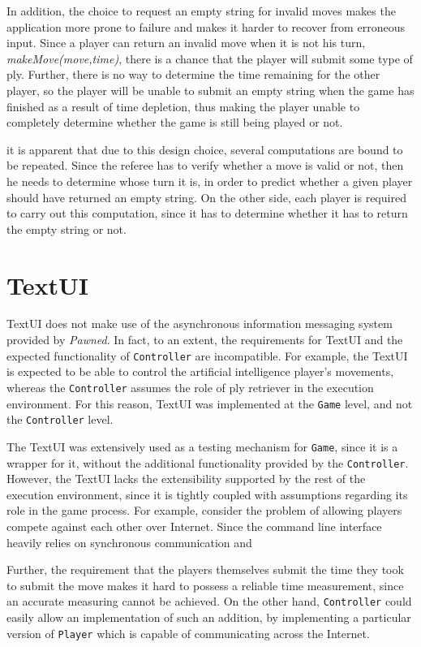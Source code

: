 In addition, the choice to request an empty string for invalid moves makes the application more prone to failure and makes it harder to
recover from erroneous input. Since a  player can return an invalid move when it is not his turn, \emph{makeMove(move,time)}, there
is a chance that the player will submit some type of ply. Further, there is no way to determine the time remaining for the other player,
so the player will be unable to submit an empty string when the game has finished as a result of time depletion, thus making the 
player unable to completely determine whether the game is still being played or not. 

it is apparent that due to this design choice, several computations are bound to be repeated. Since the referee has to verify whether a 
move is valid or not, then he needs to determine whose turn it is, in order to predict whether a given player should have returned an 
empty string. On the other side, each player is required to carry out this computation, since it has to determine whether it has to return 
the empty string or not. 

\section{TextUI} 
 
TextUI does not make use of the asynchronous information messaging system provided by \emph{Pawned}. In fact, to an extent, 
the requirements for TextUI and the expected functionality of \texttt{Controller} are incompatible. For example, 
the TextUI is expected to be able to control the artificial intelligence player's movements, whereas the \texttt{Controller}
assumes the role of ply retriever in the execution environment. For this reason, TextUI was implemented at the \texttt{Game}
level, and not the \texttt{Controller} level. 

The TextUI was extensively used as a testing mechanism for \texttt{Game}, since it is a wrapper for it, without the
additional functionality provided by the \texttt{Controller}. However, the TextUI lacks the extensibility supported
by the rest of the execution environment, since it is tightly coupled with assumptions regarding its role in the
game process. For example, consider the problem of allowing players compete against each other over Internet. Since 
the command line interface heavily relies on synchronous communication and 

Further, the requirement that the players themselves submit the time they took to submit the move makes it hard to possess 
a reliable time measurement, since an accurate measuring cannot be achieved. On the other hand, \texttt{Controller} could easily
allow an implementation of such an addition, by implementing a particular version of \texttt{Player} which is capable of 
communicating across the Internet. 